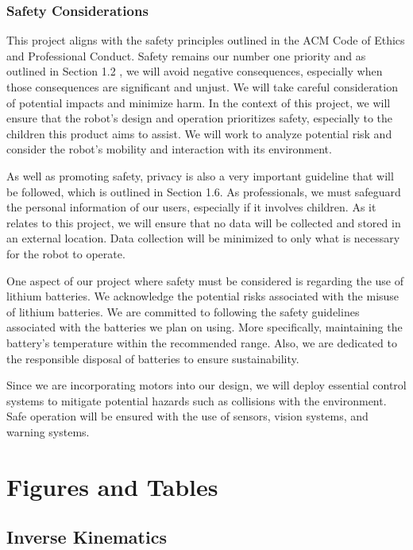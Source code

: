 \documentclass{report}
\begin{document}
    \subsection{Safety Considerations}
    This project aligns with the safety principles outlined in the ACM Code of Ethics and Professional Conduct. Safety remains our number one priority and as outlined in Section 1.2 \cite{ACM_2018}, we will avoid negative consequences, especially when those consequences are significant and unjust. We will take careful consideration of potential impacts and minimize harm. In the context of this project, we will ensure that the robot’s design and operation prioritizes safety, especially to the children this product aims to assist. We will work to analyze potential risk and consider the robot’s mobility and interaction with its environment.

    As well as promoting safety, privacy is also a very important guideline that will be followed, which is outlined in Section 1.6. As professionals, we must safeguard the personal information of our users, especially if it involves children. As it relates to this project, we will ensure that no data will be collected and stored in an external location. Data collection will be minimized to only what is necessary for the robot to operate.

    One aspect of our project where safety must be considered is regarding the use of lithium batteries. We acknowledge the potential risks associated with the misuse of lithium batteries. We are committed to following the safety guidelines associated with the batteries we plan on using. More specifically, maintaining the battery’s temperature within the recommended range. Also, we are dedicated to the responsible disposal of batteries to ensure sustainability.

    Since we are incorporating motors into our design, we will deploy essential control systems to mitigate potential hazards such as collisions with the environment. Safe operation will be ensured with the use of sensors, vision systems, and warning systems.

    \chapter{Figures and Tables}

    \section{Inverse Kinematics}
\end{document}
